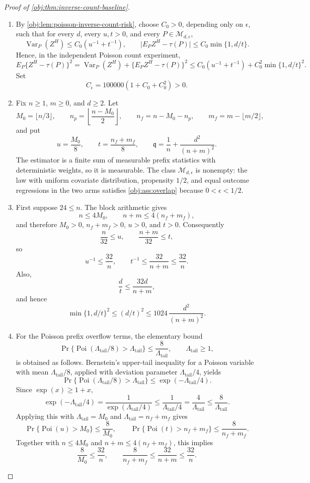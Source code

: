 \documentclass[11pt]{article}
\begin{document}
\begin{proof}[Proof of \cref{obj:thm:inverse-count-baseline}]
\begin{enumerate}
\item By \cref{obj:lem:poisson-inverse-count-risk}, choose \(C_0>0\), depending only on \(\epsilon\), such that for every \(d\), every \(u,t>0\), and every \(P\in\mathcal M_{d,\epsilon}\),
\[
\operatorname{Var}_P(Z^H)\le C_0(u^{-1}+t^{-1}),
\qquad
\bigl|E_P Z^H-\tau(P)\bigr|\le C_0\min\{1,d/t\}.
\]
Hence, in the independent Poisson count experiment,
\[
E_P\{Z^H-\tau(P)\}^2
=
\operatorname{Var}_P(Z^H)+\{E_PZ^H-\tau(P)\}^2
\le
C_0(u^{-1}+t^{-1})
+
C_0^2\min\{1,d/t\}^2 .
\]
Set
\[
C_\epsilon=100000(1+C_0+C_0^2)>0 .
\]

\item Fix \(n\ge1\), \(m\ge0\), and \(d\ge2\).  Let
\[
M_0=\lfloor n/3\rfloor,\qquad
n_p=\left\lfloor\frac{n-M_0}{2}\right\rfloor,\qquad
n_f=n-M_0-n_p,\qquad
m_f=m-\lfloor m/2\rfloor ,
\]
and put
\[
u=\frac{M_0}{8},\qquad
t=\frac{n_f+m_f}{8},\qquad
\mathfrak q=\frac1n+\frac{d^2}{(n+m)^2}.
\]
The estimator is a finite sum of measurable prefix statistics with deterministic weights, so it is measurable.  The class \(\mathcal M_{d,\epsilon}\) is nonempty: the law with uniform covariate distribution, propensity \(1/2\), and equal outcome regressions in the two arms satisfies \cref{obj:ass:overlap} because \(0<\epsilon<1/2\). %

\item First suppose \(24\le n\).  The block arithmetic gives
\[
n\le4M_0,\qquad n+m\le4(n_f+m_f),
\]
and therefore \(M_0>0\), \(n_f+m_f>0\), \(u>0\), and \(t>0\).  Consequently
\[
\frac n{32}\le u,\qquad
\frac{n+m}{32}\le t,
\]
so
\[
u^{-1}\le\frac{32}{n},
\qquad
t^{-1}\le\frac{32}{n+m}\le\frac{32}{n}.
\]
Also,
\[
\frac dt\le \frac{32d}{n+m},
\]
and hence
\[
\min\{1,d/t\}^2
\le (d/t)^2
\le
1024\,\frac{d^2}{(n+m)^2}.
\]

\item For the Poisson prefix overflow terms, the elementary bound
\[
\Pr\{\operatorname{Poi}(\Lambda_{\mathrm{tail}}/8)>\Lambda_{\mathrm{tail}}\}
\le \frac8{\Lambda_{\mathrm{tail}}},\qquad \Lambda_{\mathrm{tail}}\ge1,
\]
is obtained as follows.  Bernstein's upper-tail inequality for a Poisson variable with mean \(\Lambda_{\mathrm{tail}}/8\), applied with deviation parameter \(\Lambda_{\mathrm{tail}}/4\), yields
\[
\Pr\{\operatorname{Poi}(\Lambda_{\mathrm{tail}}/8)>\Lambda_{\mathrm{tail}}\}
\le \exp(-\Lambda_{\mathrm{tail}}/4).
\]
Since \(\exp(x)\ge 1+x\),
\[
\exp(-\Lambda_{\mathrm{tail}}/4)=\frac1{\exp(\Lambda_{\mathrm{tail}}/4)}
\le \frac1{\Lambda_{\mathrm{tail}}/4}
=\frac4{\Lambda_{\mathrm{tail}}}
\le\frac8{\Lambda_{\mathrm{tail}}} .
\]
Applying this with \(\Lambda_{\mathrm{tail}}=M_0\) and \(\Lambda_{\mathrm{tail}}=n_f+m_f\) gives
\[
\Pr\{\operatorname{Poi}(u)>M_0\}\le \frac8{M_0},
\qquad
\Pr\{\operatorname{Poi}(t)>n_f+m_f\}\le \frac8{n_f+m_f}.
\]
Together with \(n\le4M_0\) and \(n+m\le4(n_f+m_f)\), this implies
\[
\frac8{M_0}\le \frac{32}{n},
\qquad
\frac8{n_f+m_f}\le \frac{32}{n+m}\le \frac{32}{n}.
\]


\end{enumerate}
\end{proof}
\end{document}
